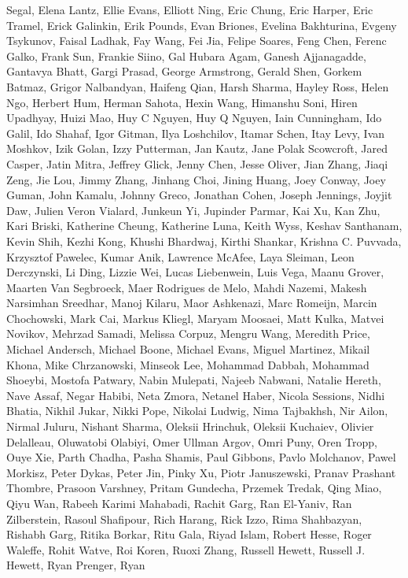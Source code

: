 Segal, Elena Lantz, Ellie Evans, Elliott Ning, Eric Chung, Eric Harper,
Eric Tramel, Erick Galinkin, Erik Pounds, Evan Briones, Evelina
Bakhturina, Evgeny Tsykunov, Faisal Ladhak, Fay Wang, Fei Jia, Felipe
Soares, Feng Chen, Ferenc Galko, Frank Sun, Frankie Siino, Gal Hubara
Agam, Ganesh Ajjanagadde, Gantavya Bhatt, Gargi Prasad, George
Armstrong, Gerald Shen, Gorkem Batmaz, Grigor Nalbandyan, Haifeng Qian,
Harsh Sharma, Hayley Ross, Helen Ngo, Herbert Hum, Herman Sahota, Hexin
Wang, Himanshu Soni, Hiren Upadhyay, Huizi Mao, Huy C Nguyen, Huy Q
Nguyen, Iain Cunningham, Ido Galil, Ido Shahaf, Igor Gitman, Ilya
Loshchilov, Itamar Schen, Itay Levy, Ivan Moshkov, Izik Golan, Izzy
Putterman, Jan Kautz, Jane Polak Scowcroft, Jared Casper, Jatin Mitra,
Jeffrey Glick, Jenny Chen, Jesse Oliver, Jian Zhang, Jiaqi Zeng, Jie Lou,
Jimmy Zhang, Jinhang Choi, Jining Huang, Joey Conway, Joey Guman, John
Kamalu, Johnny Greco, Jonathan Cohen, Joseph Jennings, Joyjit Daw,
Julien Veron Vialard, Junkeun Yi, Jupinder Parmar, Kai Xu, Kan Zhu, Kari
Briski, Katherine Cheung, Katherine Luna, Keith Wyss, Keshav Santhanam,
Kevin Shih, Kezhi Kong, Khushi Bhardwaj, Kirthi Shankar, Krishna C.
Puvvada, Krzysztof Pawelec, Kumar Anik, Lawrence McAfee, Laya Sleiman,
Leon Derczynski, Li Ding, Lizzie Wei, Lucas Liebenwein, Luis Vega, Maanu
Grover, Maarten Van Segbroeck, Maer Rodrigues de Melo, Mahdi Nazemi,
Makesh Narsimhan Sreedhar, Manoj Kilaru, Maor Ashkenazi, Marc Romeijn,
Marcin Chochowski, Mark Cai, Markus Kliegl, Maryam Moosaei, Matt Kulka,
Matvei Novikov, Mehrzad Samadi, Melissa Corpuz, Mengru Wang, Meredith
Price, Michael Andersch, Michael Boone, Michael Evans, Miguel Martinez,
Mikail Khona, Mike Chrzanowski, Minseok Lee, Mohammad Dabbah, Mohammad
Shoeybi, Mostofa Patwary, Nabin Mulepati, Najeeb Nabwani, Natalie
Hereth, Nave Assaf, Negar Habibi, Neta Zmora, Netanel Haber, Nicola
Sessions, Nidhi Bhatia, Nikhil Jukar, Nikki Pope, Nikolai Ludwig, Nima
Tajbakhsh, Nir Ailon, Nirmal Juluru, Nishant Sharma, Oleksii Hrinchuk,
Oleksii Kuchaiev, Olivier Delalleau, Oluwatobi Olabiyi, Omer Ullman
Argov, Omri Puny, Oren Tropp, Ouye Xie, Parth Chadha, Pasha Shamis, Paul
Gibbons, Pavlo Molchanov, Pawel Morkisz, Peter Dykas, Peter Jin, Pinky
Xu, Piotr Januszewski, Pranav Prashant Thombre, Prasoon Varshney, Pritam
Gundecha, Przemek Tredak, Qing Miao, Qiyu Wan, Rabeeh Karimi Mahabadi,
Rachit Garg, Ran El-Yaniv, Ran Zilberstein, Rasoul Shafipour, Rich
Harang, Rick Izzo, Rima Shahbazyan, Rishabh Garg, Ritika Borkar, Ritu
Gala, Riyad Islam, Robert Hesse, Roger Waleffe, Rohit Watve, Roi Koren,
Ruoxi Zhang, Russell Hewett, Russell J. Hewett, Ryan Prenger, Ryan
